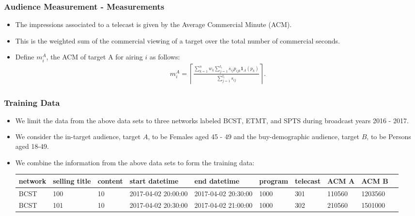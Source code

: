 \documentclass{beamer}
\begin{document}
\begin{frame}
  \frametitle{Audience Measurement - Measurements}
  \begin{itemize}
    \item The impressions associated to a telecast is given by the Average Commercial Minute (ACM).
      \pause
      \item This is the weighted sum of the commercial viewing of a target over the total number of commercial seconds.
        \pause
      \item Define $m_{i}^A$, the ACM of target A for airing $i$ as follows:
  \begin{align}\label{acm_def}
    m_{i}^A = \left\lceil\frac{\sum_{k=1}^n w_k \sum_{j=1}^{t_i} s_{ij} p_{ijk} \textbf{1}_A(p_{k})}{\sum_{j=1}^{t_i} s_{ij}}\right\rceil.
  \end{align}
\end{itemize}
\end{frame}


\begin{frame}
\frametitle{Training Data}

\begin{itemize}
  \item We limit the data from the above data sets to three networks labeled BCST, ETMT, and SPTS during broadcast years 2016 - 2017.
  \item We consider the in-target audience, target $A$, to be Females aged 45 - 49 and the buy-demographic audience, target $B$,
    to be Persons aged 18-49.
  \item We combine the information from the above data sets to form the training data:
  \begin{table}[h!]
    \centering
    \begin{adjustbox}{width=0.9\textwidth}
      \large
      \begin{tabular}{llllllllll}
        network & selling title & content & start datetime & end datetime & program & telecast & ACM A & ACM B\\
        \hline
        BCST & 100 & 10 & 2017-04-02 20:00:00 & 2017-04-02 20:30:00 & 1000 & 301 & 110560 & 1203560\\
        BCST & 101 & 10 & 2017-04-02 20:30:00 & 2017-04-02 21:00:00 & 1000 & 302 & 210560 & 1501000\\
      \end{tabular}
    \end{adjustbox}
  \end{table}
\end{itemize}
\end{frame}
\end{document}
